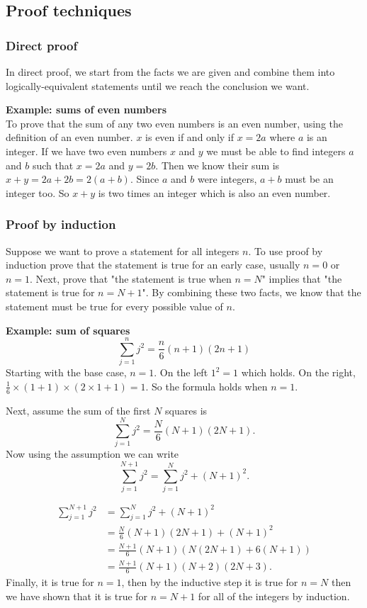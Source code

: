\documentclass[10pt, a4paper]{article}
\begin{document}
\subsection{Proof techniques}
\subsubsection{Direct proof}
In direct proof, we start from the facts we are given and combine them into logically-equivalent statements until we reach the conclusion we want.

\textbf{Example: sums of even numbers} \\
To prove that the sum of any two even numbers is an even number, using the definition of an even number. $x$ is even if and only if $x = 2a$ where $a$ is an integer. If we have two even numbers $x$ and $y$ we must be able to find integers $a$ and $b$ such that $x = 2a$ and $y = 2b$. Then we know their sum is $x + y = 2a + 2b = 2(a + b)$. Since $a$ and $b$ were integers, $a + b$ must be an integer too. So $x + y$ is two times an integer which is also an even number.

\subsubsection{Proof by induction}
Suppose we want to prove a statement for all integers $n$. To use proof by induction prove that the statement is true for an early case, usually $n = 0$ or $n = 1$. Next, prove that "the statement is true when $n = N$" implies that "the statement is true for $n = N + 1$". By combining these two facts, we know that the statement must be true for every possible value of $n$.

\textbf{Example: sum of squares} \\
\[
\sum_{j = 1}^{n}{j ^ 2} = \frac{n}{6}(n + 1)(2n + 1)
\]
Starting with the base case, $n = 1$. On the left $1 ^ 2 = 1$ which holds. On the right, $\frac{1}{6} \times (1 + 1) \times (2 \times 1 + 1) = 1$. So the formula holds when $n = 1$.

Next, assume the sum of the first $N$ squares is
\[
\sum_{j = 1}^{N}{j ^ 2} = \frac{N}{6}(N + 1)(2N + 1).
\]
Now using the assumption we can write
\[
\sum_{j = 1}^{N + 1}{j ^ 2} = \sum_{j = 1}^{N}{j ^ 2} + (N + 1) ^ 2.
\]

\begin{align*}
    \sum_{j = 1}^{N + 1}{j ^ 2} &= \sum_{j = 1}^{N}{j ^ 2} + (N + 1) ^ 2 \\
    &= \frac{N}{6}(N + 1)(2N + 1) + (N + 1) ^ 2 \\
    &= \frac{N + 1}{6}(N + 1)\left(N(2N + 1) + 6(N + 1)\right) \\
    &= \frac{N + 1}{6}(N + 1)(N + 2)(2N + 3).
\end{align*}
Finally, it is true for $n = 1$, then by the inductive step it is true for $n = N$ then we have shown that it is true for $n = N + 1$ for all of the integers by induction.
\end{document}
